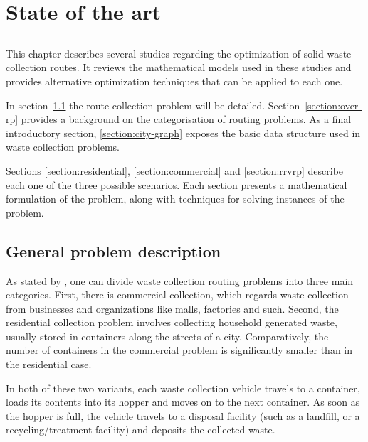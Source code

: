 \chapter{State of the art} \label{chap:sota}

\section*{}

This chapter describes several studies regarding the optimization of solid
waste collection routes. It reviews the mathematical models used in these
studies and provides alternative optimization techniques that can be applied to
each one.

In section~\ref{section:problem} the route collection problem will be detailed.
Section~\ref{section:over-rp} provides a background on the categorisation of
routing problems. As a final introductory section, \ref{section:city-graph}
exposes the basic data structure used in waste collection problems.

Sections \ref{section:residential}, \ref{section:commercial} and
\ref{section:rrvrp} describe each one of the three possible scenarios. Each
section presents a mathematical formulation of the problem, along with techniques
for solving instances of the problem.





\section{General problem description}
\label{section:problem}

As stated by \citet{Golden01}, one can divide waste collection routing problems
into three main categories. First, there is commercial collection, which
regards waste collection from businesses and organizations like malls,
factories and such. Second, the residential collection problem involves
collecting household generated waste, usually stored in containers along the
streets of a city. Comparatively, the number of containers in the commercial
problem is significantly smaller than in the residential case.

In both of these two variants, each waste collection vehicle travels to a
container, loads its contents into its hopper and moves on to the next
container. As soon as the hopper is full, the vehicle travels to a disposal
facility (such as a landfill, or a recycling/treatment facility) and deposits
the collected waste.

